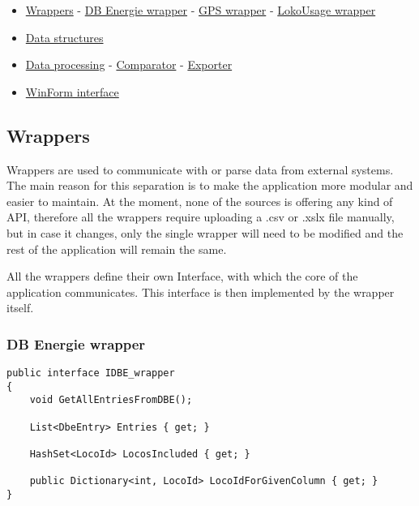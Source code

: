 \documentclass[11pt]{article}
\begin{document}
\begin{itemize}
    \item \hyperref[sec:Wrappers]{Wrappers}
    \subitem - \hyperref[sec:DBEnergieWrapper]{DB Energie wrapper}
    \subitem - \hyperref[sec:GPSWrapper]{GPS wrapper}
    \subitem - \hyperref[sec:LokoUsageWrapper]{LokoUsage wrapper}
    \item \hyperref[sec:DataStructures]{Data structures}
    \item \hyperref[sec:DataProcessing]{Data processing}
    \subitem - \hyperref[sec:Comparator]{Comparator}
    \subitem - \hyperref[sec:Exporter]{Exporter}
    \item \hyperref[sec:WinFormInterface]{WinForm interface}
\end{itemize}

\pagebreak

\subsection{Wrappers}
\label{sec:Wrappers}

Wrappers are used to communicate with or parse data from external systems. The main reason for this separation is to make the application more modular and easier to maintain. At the moment, none of the sources is offering any kind of API, therefore all the wrappers require uploading a .csv or .xslx file manually, but in case it changes, only the single wrapper will need to be modified and the rest of the application will remain the same.

All the wrappers define their own Interface, with which the core of the application communicates. This interface is then implemented by the wrapper itself.

\subsubsection{DB Energie wrapper}
\label{sec:DBEnergieWrapper}

\begin{verbatim}
public interface IDBE_wrapper
{
    void GetAllEntriesFromDBE();

    List<DbeEntry> Entries { get; }

    HashSet<LocoId> LocosIncluded { get; }

    public Dictionary<int, LocoId> LocoIdForGivenColumn { get; }
}
\end{verbatim}
\end{document}
